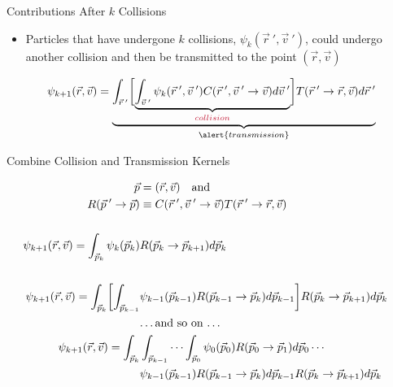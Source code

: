 \documentclass[xcolor=x11names,compress,handout]{beamer}
\renewcommand{\(}{\begin{columns}}
\renewcommand{\)}{\end{columns}}
\newcommand{\<}[1]{\begin{column}{#1}}
\renewcommand{\>}{\end{column}}
\begin{document}
\begin{frame}{Contributions After $k$ Collisions}

\begin{itemize}
\item Particles that have undergone $k$ collisions, $\psi_k(\vec{r}\:', \vec{v}\:')$, could undergo another \textcolor{cardinal}{collision} and then be \alert{transmitted} to the point $(\vec{r}, \vec{v})$ 
\end{itemize}

\[\psi_{k+1}(\vec{r}, \vec{v}) = \underbrace{\int_{\vec{r}\:'} \biggl[ \underbrace{\int_{\vec{v}\:'} \psi_k(\vec{r}\:', \vec{v}\:') C(\vec{r}\:', \vec{v}\:' \rightarrow \vec{v})  d\vec{v}\:'}_{\textcolor{cardinal}{collision}}\biggr] T(\vec{r}\:' \rightarrow \vec{r}, \vec{v}) d\vec{r}\:'}_{\alert{transmission}}\]

\end{frame}



\begin{frame}{Combine Collision and Transmission Kernels}

\begin{align*}
\vec{p} &= (\vec{r}, \vec{v}) \quad \text{and}\\
%
R(\vec{p}\:'\rightarrow\vec{p}) &\equiv C(\vec{r}\:', \vec{v}\:' \rightarrow \vec{v}) T(\vec{r}\:' \rightarrow \vec{r}, \vec{v}) \\
&\\
%
\psi_{k+1}(\vec{r}, \vec{v}) = \int_{\vec{p}_k} \psi_k(\vec{p}_k) &R(\vec{p}_k \rightarrow \vec{p}_{k+1}) d\vec{p}_k \\
%
&\\
\psi_{k+1}(\vec{r}, \vec{v}) = \int_{\vec{p}_k} \biggl[ \int_{\vec{p}_{k-1}}  &\psi_{k-1}(\vec{p}_{k-1}) R(\vec{p}_{k-1} \rightarrow \vec{p}_{k}) d\vec{p}_{k-1} \biggr] R(\vec{p}_k \rightarrow \vec{p}_{k+1}) d\vec{p}_k \\
&\text{\dots and so on \dots}
&\\
\psi_{k+1}(\vec{r}, \vec{v}) = \int_{\vec{p}_k} &\int_{\vec{p}_{k-1}} \cdots \int_{\vec{p}_0} \psi_{0}(\vec{p}_{0}) R(\vec{p}_{0} \rightarrow \vec{p}_{1}) d\vec{p}_{0} \cdots \\
&\psi_{k-1}(\vec{p}_{k-1}) R(\vec{p}_{k-1} \rightarrow \vec{p}_{k}) d\vec{p}_{k-1} R(\vec{p}_k \rightarrow \vec{p}_{k+1}) d\vec{p}_k \\
\end{align*}

\end{frame}
\end{document}
